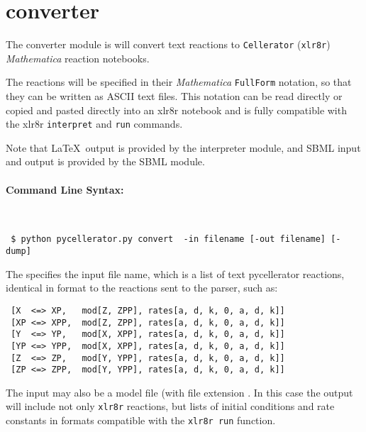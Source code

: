 \newpage
\section{converter}

The converter module is will convert  text reactions to {\tt Cellerator} ({\tt xlr8r}) \textit{Mathematica} reaction notebooks. 

The reactions will be specified in their \textit{Mathematica} {\tt FullForm} notation, so that they can be written as ASCII text files. This notation can be read directly or copied and pasted directly into an xlr8r notebook and is fully compatible with the xlr8r {\tt interpret} and {\tt run} commands.

Note that \LaTeX\ output is provided by the interpreter module, and SBML  input and output is provided by the SBML module.

\paragraph{Command Line Syntax:}\ \\

\begin{lstlisting}
 $ python pycellerator.py convert  -in filename [-out filename] [-dump]
\end{lstlisting}


The  specifies the input file name, which is a list of text pycellerator reactions, identical in format to the reactions sent to the parser, such as: 

\begin{lstlisting} 
 [X  <=> XP,   mod[Z, ZPP], rates[a, d, k, 0, a, d, k]]
 [XP <=> XPP,  mod[Z, ZPP], rates[a, d, k, 0, a, d, k]]
 [Y  <=> YP,   mod[X, XPP], rates[a, d, k, 0, a, d, k]] 
 [YP <=> YPP,  mod[X, XPP], rates[a, d, k, 0, a, d, k]] 
 [Z  <=> ZP,   mod[Y, YPP], rates[a, d, k, 0, a, d, k]]
 [ZP <=> ZPP,  mod[Y, YPP], rates[a, d, k, 0, a, d, k]]
\end{lstlisting}

The input  may also be a model file (with file extension . In this case the output will include not only {\tt xlr8r} reactions, but lists of initial conditions and rate constants in formats compatible with the {\tt xlr8r run} function. 


